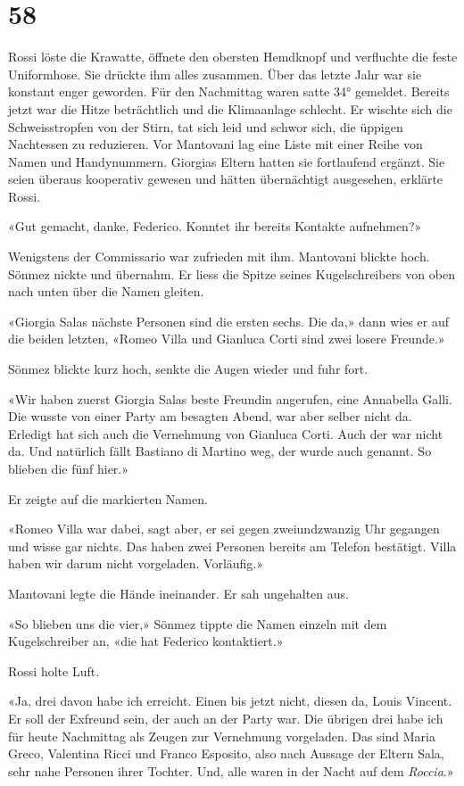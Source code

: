 \chapter{58}


Rossi löste die Krawatte, öffnete den obersten Hemdknopf und verfluchte
die feste Uniformhose. Sie drückte ihm alles zusammen. Über das letzte
Jahr war sie konstant enger geworden. Für den Nachmittag waren satte 34°
gemeldet. Bereits jetzt war die Hitze beträchtlich und die Klimaanlage
schlecht. Er wischte sich die Schweisstropfen von der Stirn, tat sich
leid und schwor sich, die üppigen Nachtessen zu reduzieren.
Vor Mantovani lag eine Liste mit einer Reihe von Namen und Handynummern.
Giorgias Eltern hatten sie fortlaufend ergänzt. Sie seien überaus
kooperativ gewesen und hätten übernächtigt ausgesehen, erklärte Rossi.

«Gut gemacht, danke, Federico. Konntet ihr bereits Kontakte aufnehmen?»

Wenigstens der Commissario war zufrieden mit ihm.
Mantovani blickte hoch. Sönmez nickte und übernahm. Er liess die Spitze
seines Kugelschreibers von oben nach unten über die Namen gleiten.

«Giorgia Salas nächste Personen sind die ersten sechs. Die da,» dann
wies er auf die beiden letzten, «Romeo Villa und Gianluca Corti sind
zwei losere Freunde.»

Sönmez blickte kurz hoch, senkte die Augen wieder und fuhr fort.

«Wir haben zuerst Giorgia Salas beste Freundin angerufen, eine Annabella
Galli. Die wusste von einer Party am besagten Abend, war aber selber
nicht da. Erledigt hat sich auch die Vernehmung von Gianluca Corti. Auch
der war nicht da. Und natürlich fällt Bastiano di Martino weg, der wurde
auch genannt. So blieben die fünf hier.»

Er zeigte auf die markierten Namen.

«Romeo Villa war dabei, sagt aber, er sei gegen zweiundzwanzig Uhr
gegangen und wisse gar nichts. Das haben zwei Personen bereits am
Telefon bestätigt. Villa haben wir darum nicht vorgeladen. Vorläufig.»

Mantovani legte die Hände ineinander. Er sah ungehalten aus.

«So blieben uns die vier,» Sönmez tippte die Namen einzeln mit dem
Kugelschreiber an, «die hat Federico kontaktiert.»

Rossi holte Luft.

«Ja, drei davon habe ich erreicht. Einen bis jetzt nicht, diesen da,
Louis Vincent. Er soll der Exfreund sein, der auch an der Party war. Die
übrigen drei habe ich für heute Nachmittag als Zeugen zur Vernehmung
vorgeladen. Das sind Maria Greco, Valentina Ricci und Franco Esposito,
also nach Aussage der Eltern Sala, sehr nahe Personen ihrer Tochter.
Und, alle waren in der Nacht auf dem \emph{Roccia}.»

